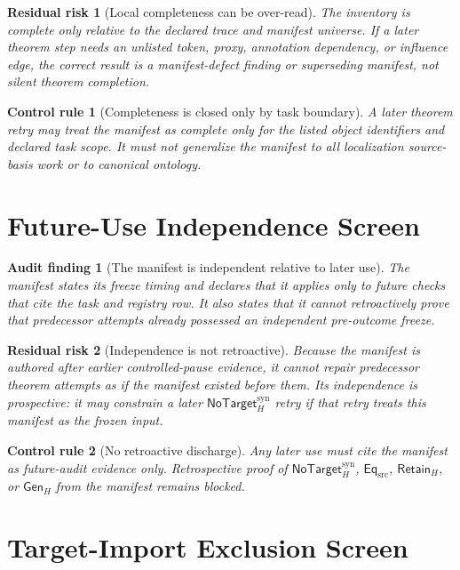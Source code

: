 \documentclass[11pt]{article}
\newcommand{\GenH}{\mathsf{Gen}_{H}}
\newcommand{\EqSrc}{\mathsf{Eq}_{\mathrm{src}}}
\newcommand{\RetainH}{\mathsf{Retain}_{H}}
\newcommand{\NoTargetSyn}{\mathsf{NoTarget}_{H}^{\mathrm{syn}}}
\newtheorem{auditfinding}{Audit finding}
\newtheorem{residualrisk}{Residual risk}
\newtheorem{controlrule}{Control rule}
\begin{document}
\begin{residualrisk}[Local completeness can be over-read]
The inventory is complete only relative to the declared trace and manifest
universe. If a later theorem step needs an unlisted token, proxy, annotation
dependency, or influence edge, the correct result is a manifest-defect
finding or superseding manifest, not silent theorem completion.
\end{residualrisk}

\begin{controlrule}[Completeness is closed only by task boundary]
A later theorem retry may treat the manifest as complete only for the
listed object identifiers and declared task scope. It must not generalize
the manifest to all localization source-basis work or to canonical
ontology.
\end{controlrule}

\section{Future-Use Independence Screen}

\begin{auditfinding}[The manifest is independent relative to later use]
The manifest states its freeze timing and declares that it applies only to
future checks that cite the task and registry row. It also states that it
cannot retroactively prove that predecessor attempts already possessed an
independent pre-outcome freeze.
\end{auditfinding}

\begin{residualrisk}[Independence is not retroactive]
Because the manifest is authored after earlier controlled-pause evidence,
it cannot repair predecessor theorem attempts as if the manifest existed
before them. Its independence is prospective: it may constrain a later
\(\NoTargetSyn\) retry if that retry treats this manifest as the frozen
input.
\end{residualrisk}

\begin{controlrule}[No retroactive discharge]
Any later use must cite the manifest as future-audit evidence only.
Retrospective proof of \(\NoTargetSyn\), \(\EqSrc\), \(\RetainH\), or
\(\GenH\) from the manifest remains blocked.
\end{controlrule}

\section{Target-Import Exclusion Screen}
\end{document}
